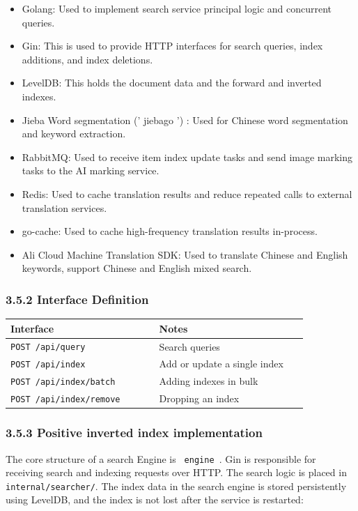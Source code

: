 \documentclass{article}
\begin{document}
\begin{itemize}
    \item Golang: Used to implement search service principal logic and concurrent queries.
    \item Gin: This is used to provide HTTP interfaces for search queries, index additions, and index deletions.
    \item LevelDB: This holds the document data and the forward and inverted indexes.
    \item Jieba Word segmentation (' jiebago ') : Used for Chinese word segmentation and keyword extraction.
    \item RabbitMQ: Used to receive item index update tasks and send image marking tasks to the AI marking service.
    \item Redis: Used to cache translation results and reduce repeated calls to external translation services.
    \item go-cache: Used to cache high-frequency translation results in-process.
    \item Ali Cloud Machine Translation SDK: Used to translate Chinese and English keywords, support Chinese and English mixed search.
\end{itemize}

\subsubsection{3.5.2 Interface Definition}

\begin{longtable}{p{0.45\linewidth}p{0.45\linewidth}}
\toprule
\textbf{Interface} & \textbf{Notes} \\
\midrule
\texttt{POST /api/query} & Search queries \\
\texttt{POST /api/index} & Add or update a single index \\
\texttt{POST /api/index/batch} & Adding indexes in bulk \\
\texttt{POST /api/index/remove} & Dropping an index \\
\bottomrule
\end{longtable}

\subsubsection{3.5.3 Positive inverted index implementation}

The core structure of a search Engine is \texttt{ engine }. Gin is responsible for receiving search and indexing requests over HTTP. The search logic is placed in \texttt{internal/searcher/}. The index data in the search engine is stored persistently using LevelDB, and the index is not lost after the service is restarted:
\end{document}
